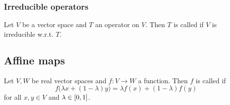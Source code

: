 \subsubsection{Irreducible operators}
\begin{definition}
Let $V$ be a vector space and $T$ an operator on $V$. Then $T$ is called  if $V$ is irreducible w.r.t. $T$.
\end{definition}

\subsection{Affine maps}
\begin{definition}
Let $V,W$ be real vector spaces and $f: V\to W$ a function. Then $f$ is called  if
\[ f\big(\lambda x + (1-\lambda)y\big) = \lambda f(x) + (1-\lambda)f(y) \]
for all $x,y\in V$ and $\lambda\in \interval{0,1}$.
\end{definition}

